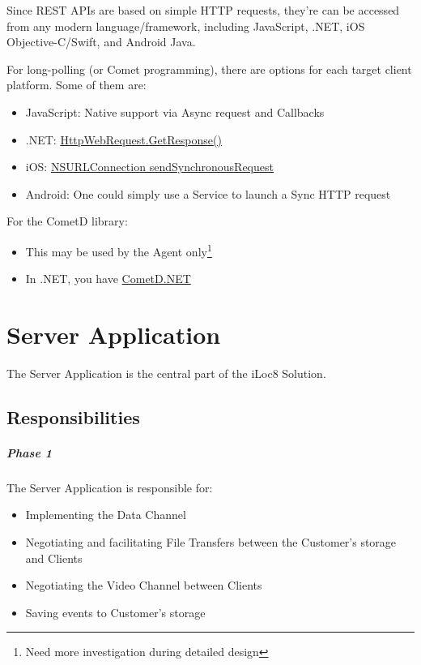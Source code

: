 \documentclass{article}
\begin{document}
	Since REST APIs are based on simple HTTP requests, they're can be accessed from any modern language/framework, including JavaScript, .NET, iOS Objective-C/Swift, and Android Java.
	
	For long-polling (or Comet programming), there are options for each target client platform. Some of them are:
	\begin{itemize}
		\item JavaScript: Native support via Async request and Callbacks
		\item .NET: \href{https://msdn.microsoft.com/en-us/library/system.net.httpwebrequest.getresponse(v=vs.110).aspx}{HttpWebRequest.GetResponse()}
		\item iOS:  \href{http://stackoverflow.com/questions/6300756/long-polling-in-objective-c}{NSURLConnection sendSynchronousRequest}
		\item Android: One could simply use a Service to launch a Sync HTTP request
	\end{itemize}
	
	For the CometD library:
	\begin{itemize}
		\item This may be used by the Agent only\footnote{Need more investigation during detailed design}
		\item In .NET, you have \href{https://github.com/Oyatel/CometD.NET}{CometD.NET}
	\end{itemize}
	
	\section{Server Application}
	
	The Server Application is the central part of the iLoc8 Solution.
	
	\subsection{Responsibilities}
	
	\subparagraph*{Phase 1}
	
	The Server Application is responsible for:
	\begin{itemize}
		\item Implementing the Data Channel
		\item Negotiating and facilitating File Transfers between the Customer's storage and Clients
		\item Negotiating the Video Channel between Clients
		\item Saving events to Customer's storage
	\end{itemize}
\end{document}
